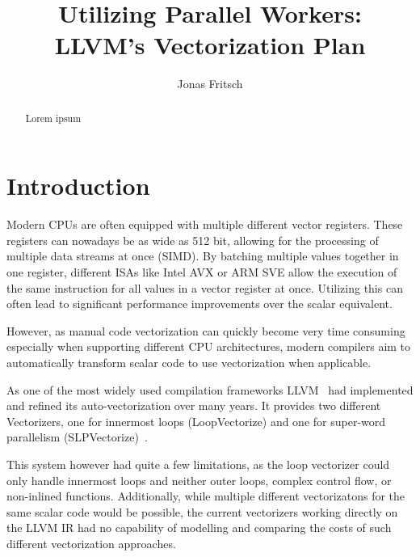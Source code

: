 \documentclass[sigplan,11pt,nonacm]{acmart}
\begin{document}
\title{Utilizing Parallel Workers: \\LLVM's Vectorization Plan}
\author{Jonas Fritsch}

\begin{abstract}
Lorem ipsum
\end{abstract}

\maketitle



\section{Introduction}
\label{sec:introduction}
Modern CPUs are often equipped with multiple different vector registers. These registers can nowadays 
be as wide as 512 bit, allowing for the processing of multiple data streams at once (SIMD). By 
batching multiple values together in one register, different ISAs like Intel AVX or ARM SVE allow 
the execution of the same instruction for all values in a vector register at once. Utilizing this 
can often lead to significant performance improvements over the scalar equivalent.

However, as manual code vectorization can quickly become very time consuming especially when
supporting different CPU architectures, modern compilers aim to automatically transform scalar code
to use vectorization when applicable.

As one of the most widely used compilation frameworks LLVM~\cite{10.5555/977395.977673} had 
implemented and refined its auto-vectorization over many years. It provides two different 
Vectorizers, one for innermost loops (LoopVectorize) and one for super-word parallelism 
(SLPVectorize)~\cite{llvmvec}.

This system however had quite a few limitations, as the loop vectorizer could only handle
innermost loops and neither outer loops, complex control flow, or non-inlined functions. 
Additionally, while multiple different vectorizatons for the same scalar code 
would be possible, the current vectorizers working directly on the LLVM IR had no capability 
of modelling and comparing the costs of such different vectorization approaches.
\end{document}

